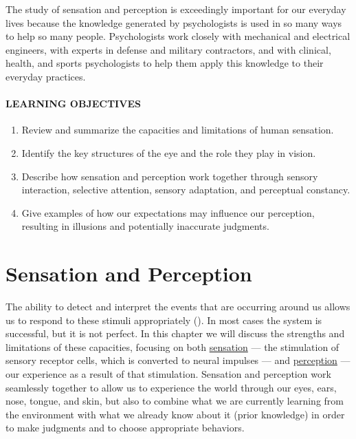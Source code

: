 \documentclass[
]{krantz}
\providecommand{\tightlist}{%
  \setlength{\itemsep}{0pt}\setlength{\parskip}{0pt}}
\begin{document}
The study of sensation and perception is exceedingly important for our everyday lives because the knowledge generated by psychologists is used in so many ways to help so many people. Psychologists work closely with mechanical and electrical engineers, with experts in defense and military contractors, and with clinical, health, and sports psychologists to help them apply this knowledge to their everyday practices.

\paragraph*{LEARNING OBJECTIVES}\label{learning-objectives-1}

\begin{enumerate}
\def\labelenumi{\arabic{enumi}.}
\tightlist
\item
  Review and summarize the capacities and limitations of human sensation.
\item
  Identify the key structures of the eye and the role they play in vision.
\item
  Describe how sensation and perception work together through sensory interaction, selective attention, sensory adaptation, and perceptual constancy.
\item
  Give examples of how our expectations may influence our perception, resulting in illusions and potentially inaccurate judgments.
\end{enumerate}

\section{Sensation and Perception}\label{sensation-and-perception}

The ability to detect and interpret the events that are occurring around us allows us to respond to these stimuli appropriately (). In most cases the system is successful, but it is not perfect. In this chapter we will discuss the strengths and limitations of these capacities, focusing on both \hyperref[sensation]{sensation} --- the stimulation of sensory receptor cells, which is converted to neural impulses --- and \hyperref[perception]{perception} --- our experience as a result of that stimulation. Sensation and perception work seamlessly together to allow us to experience the world through our eyes, ears, nose, tongue, and skin, but also to combine what we are currently learning from the environment with what we already know about it (prior knowledge) in order to make judgments and to choose appropriate behaviors.
\end{document}
